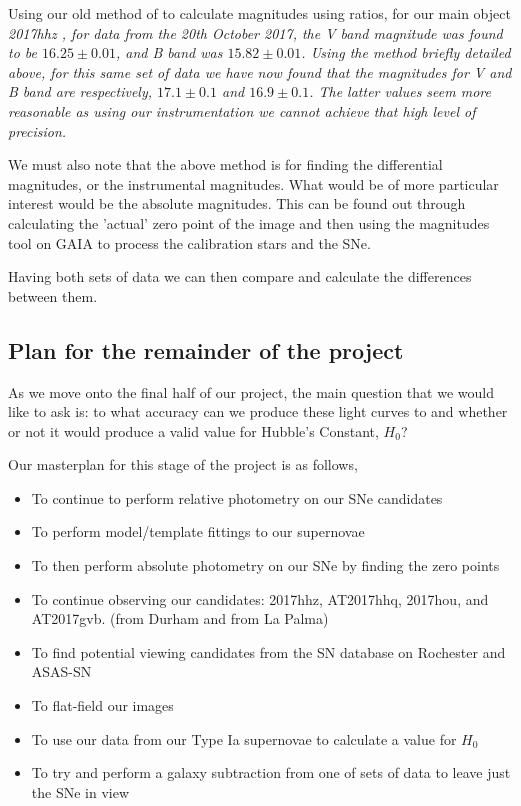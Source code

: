 \documentclass[twocolumn]{revtex4}
\begin{document}
Using our old method of to calculate magnitudes using ratios, for our main object \em{2017hhz }\em, for data from the 20th October 2017, the V band magnitude was found to be $16.25\pm0.01$, and B band was $15.82\pm0.01$. Using the method briefly detailed above, for this same set of data we have now found that the magnitudes for V and B band are respectively, $17.1\pm0.1$ and $16.9\pm0.1$. The latter values seem more reasonable as using our instrumentation we cannot achieve that high level of precision.

We must also note that the above method is for finding the differential magnitudes, or the instrumental magnitudes. What would be of more particular interest would be the absolute magnitudes. This can be found out through calculating the 'actual' zero point of the image and then using the magnitudes tool on GAIA to process the calibration stars and the SNe.

Having both sets of data we can then compare and calculate the differences between them.

\vspace{-3ex}
\subsection{Plan for the remainder of the project}
\vspace{-2ex}
As we move onto the final half of our project, the main question that we would like to ask is: to what accuracy can we produce these light curves to and whether or not it would produce a valid value for Hubble's Constant, $H_0$?

Our masterplan for this stage of the project is as follows,
\begin{itemize}
 \item To continue to perform relative photometry on our SNe candidates
 \item To perform model/template fittings to our supernovae
 \item To then perform absolute photometry on our SNe by finding the zero points
 \item To continue observing our candidates: 2017hhz, AT2017hhq, 2017hou, and AT2017gvb. (from Durham and from La Palma)
 \item To find potential viewing candidates from the SN database on Rochester and ASAS-SN
 \item To flat-field our images
 \item To use our data from our Type Ia supernovae to calculate a value for $H_0$
 \item To try and perform a galaxy subtraction from one of sets of data to leave just the SNe in view

\end{itemize}
\end{document}
